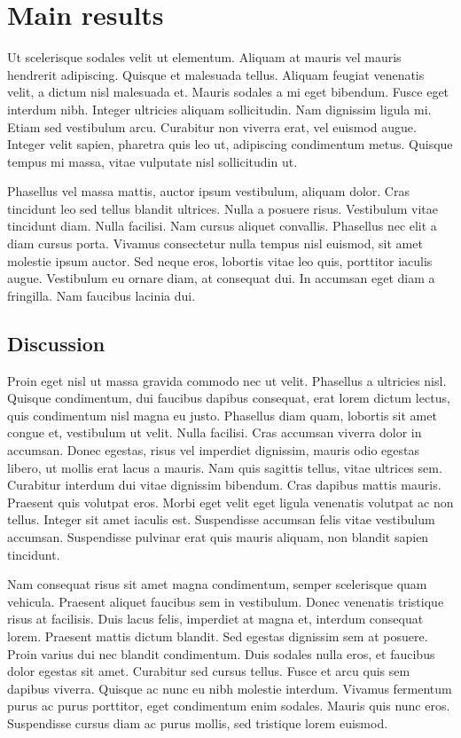 \section{Main results}

Ut scelerisque sodales velit ut elementum. Aliquam at mauris vel mauris
hendrerit adipiscing. Quisque et malesuada tellus. Aliquam feugiat venenatis
velit, a dictum nisl malesuada et. Mauris sodales a mi eget bibendum. Fusce
eget interdum nibh. Integer ultricies aliquam sollicitudin. Nam dignissim
ligula mi. Etiam sed vestibulum arcu. Curabitur non viverra erat, vel euismod
augue. Integer velit sapien, pharetra quis leo ut, adipiscing condimentum
metus. Quisque tempus mi massa, vitae vulputate nisl sollicitudin ut.

Phasellus vel massa mattis, auctor ipsum vestibulum, aliquam dolor. Cras
tincidunt leo sed tellus blandit ultrices. Nulla a posuere risus. Vestibulum
vitae tincidunt diam. Nulla facilisi. Nam cursus aliquet convallis. Phasellus
nec elit a diam cursus porta. Vivamus consectetur nulla tempus nisl euismod,
sit amet molestie ipsum auctor. Sed neque eros, lobortis vitae leo quis,
porttitor iaculis augue. Vestibulum eu ornare diam, at consequat dui. In
accumsan eget diam a fringilla. Nam faucibus lacinia dui. 

\subsection{Discussion}

Proin eget nisl ut massa gravida commodo nec ut velit. Phasellus a ultricies
nisl. Quisque condimentum, dui faucibus dapibus consequat, erat lorem dictum
lectus, quis condimentum nisl magna eu justo. Phasellus diam quam, lobortis
sit amet congue et, vestibulum ut velit. Nulla facilisi. Cras accumsan viverra
dolor in accumsan. Donec egestas, risus vel imperdiet dignissim, mauris odio
egestas libero, ut mollis erat lacus a mauris. Nam quis sagittis tellus, vitae
ultrices sem. Curabitur interdum dui vitae dignissim bibendum. Cras dapibus
mattis mauris. Praesent quis volutpat eros. Morbi eget velit eget ligula
venenatis volutpat ac non tellus. Integer sit amet iaculis est. Suspendisse
accumsan felis vitae vestibulum accumsan. Suspendisse pulvinar erat quis
mauris aliquam, non blandit sapien tincidunt.

Nam consequat risus sit amet magna condimentum, semper scelerisque quam
vehicula. Praesent aliquet faucibus sem in vestibulum. Donec venenatis
tristique risus at facilisis. Duis lacus felis, imperdiet at magna et,
interdum consequat lorem. Praesent mattis dictum blandit. Sed egestas
dignissim sem at posuere. Proin varius dui nec blandit condimentum. Duis
sodales nulla eros, et faucibus dolor egestas sit amet. Curabitur sed cursus
tellus. Fusce et arcu quis sem dapibus viverra. Quisque ac nunc eu nibh
molestie interdum. Vivamus fermentum purus ac purus porttitor, eget
condimentum enim sodales. Mauris quis nunc eros. Suspendisse cursus diam ac
purus mollis, sed tristique lorem euismod. 

